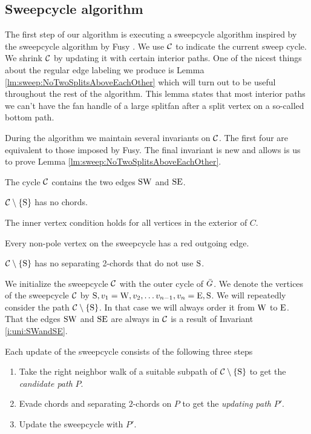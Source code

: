 
\subsection{Sweepcycle algorithm}
\thispagestyle{plain}
\label{ss:sweep}
The first step of our algorithm is executing a sweepcycle algorithm inspired by the sweepcycle algorithm by Fusy \cite{Fusy2006}. We use $\mathcal{C}$ to indicate the current sweep cycle. We shrink $\mathcal{C}$ by updating it with certain interior paths.
One of the nicest things about the regular edge labeling we produce is Lemma \ref{lm:sweep:NoTwoSplitsAboveEachOther} which will turn out to be useful throughout the rest of the algorithm. This lemma states that most interior paths we can't have the fan handle of a large splitfan after a split vertex on a so-called bottom path. 

During the algorithm we maintain several invariants on $\mathcal{C}$. The first four are equivalent to those imposed by Fusy. The final invariant is new and allows is us to prove Lemma \ref{lm:sweep:NoTwoSplitsAboveEachOther}.

\begin{invariants}
  \itemsep=-4pt
  \item \label{i:uni:SWandSE} The cycle $\mathcal{C}$ contains the two edges $\mathrm{S} \mathrm{W}$ and $\mathrm{S} \mathrm{E}$.
  \item \label{i:uni:noChords} $\mathcal{C} \setminus \left\lbrace {\mathrm{S}} \right\rbrace$ has no chords.
  \item \label{i:uni:intVertCond} The inner vertex condition holds for all vertices in the exterior of $C$.
  \item \label{i:uni:redOutgoing} Every non-pole vertex on the sweepcycle has a red outgoing edge.
  \item \label{i:uni:no2Chords} $\mathcal{C}\setminus \left\lbrace {\mathrm{S}} \right\rbrace$ has no separating 2-chords that do not use $\mathrm{S}$.
\end{invariants}

We initialize the sweepcycle $\mathcal{C}$ with the outer cycle of $\bar{G}$.
We denote the vertices of the sweepcycle $\mathcal{C}$ by $\mathrm{S}, v_1 = \mathrm{W}, v_2, \ldots v_{n-1}, v_n = \mathrm{E}, \mathrm{S}$.   We will repeatedly consider the path $\mathcal{C} \setminus \left\lbrace {\mathrm{S}} \right\rbrace$. In that case we will always order it from $\mathrm{W}$ to $\mathrm{E}$. That the edges $\mathrm{S} \mathrm{W}$ and $\mathrm{S} \mathrm{E}$ are always in $\mathcal{C}$ is a result of Invariant \ref{i:uni:SWandSE}.


Each update of the sweepcycle consists of the following three steps
\begin{enumerate}
  \itemsep=-4pt
  \item Take the right neighbor walk of a suitable subpath of $\mathcal{C} \setminus \left\lbrace {\mathrm{S}} \right\rbrace$ to get the \emph{candidate path} $P$.
  \item Evade chords and separating $2$-chords on $P$ to get the \emph{updating path} $P'$.
  \item Update the sweepcycle with $P'$.
\end{enumerate}

